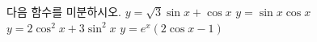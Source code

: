 다음 함수를 미분하시오.
 $y=\sqrt{3}\sin x+\cos x$
 $y=\sin x\cos x$
 $y=2\cos^2 x+3\sin^2 x$
 $y=e^x(2\cos x-1)$

